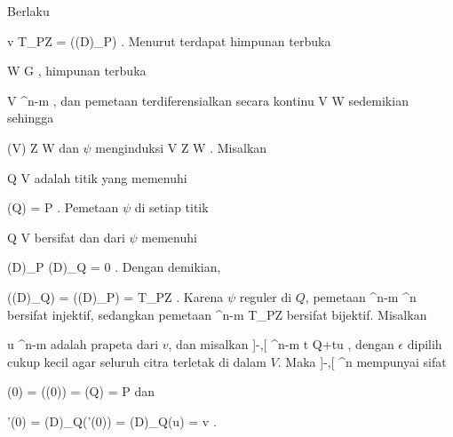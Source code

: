 

Berlaku

\mavergleichskettedisp
{\vergleichskette
{ v
}
{ \in }{ T_PZ
}
{ = }{ \ker \left((D\varphi)_P\right)
}
{ } {
}
{ } {
}
}
{}{}{.}
Menurut
terdapat himpunan terbuka

 {}
 {W \subseteq G} {}
 {} {} {} {,}
himpunan terbuka

\mavergleichskette
{\vergleichskette
{ V
}
{ \subseteq }{ \R^{n-m}
}
{ } {
}
{ } {
}
{ } {
}
}
{}{}{,}
dan pemetaan terdiferensialkan secara kontinu
\maabbdisp {\psi} { V } { W } {}
sedemikian sehingga

\mavergleichskette
{\vergleichskette
{ \psi(V)
}
{ \subseteq }{ Z \cap W
}
{ } {
}
{ } {
}
{ } {
}
}
{}{}{}
dan $\psi$ menginduksi
\maabbdisp {\psi} { V } { Z \cap W } {}.
Misalkan

\mavergleichskette
{\vergleichskette
{ Q
}
{ \in }{ V
}
{ } {
}
{ } {
}
{ } {
}
}
{}{}{}
adalah titik yang memenuhi

\mavergleichskettedisp
{\vergleichskette
{ \psi(Q)
}
{ =} { P
}
{ } {
}
{ } {
}
{ } {
}
}
{}{}{.}
Pemetaan $\psi$ di setiap titik

\mavergleichskette
{\vergleichskette
{ Q
}
{ \in }{ V
}
{ } {
}
{ } {
}
{ } {
}
}
{}{}{}
bersifat
dan
dari $\psi$ memenuhi

\mavergleichskettedisp
{\vergleichskette
{ (D\varphi)_P \circ (D\psi)_Q
}
{ =} { 0
}
{ } {
}
{ } {
}
{ } {
}
}
{}{}{.}
Dengan demikian,

\mavergleichskettedisp
{\vergleichskette
{  \left((D\psi)_Q\right)
}
{ =} { \ker \left((D\varphi)_P\right)
}
{ =} { T_PZ
}
{ } {
}
{ } {
}
}
{}{}{.}
Karena $\psi$ reguler di $Q$, pemetaan
 { \R^{n-m} } { \R^n } {}
bersifat injektif, sedangkan pemetaan
 { \R^{n-m} } { T_PZ } {}
bersifat bijektif. Misalkan

\mavergleichskette
{\vergleichskette
{ u
}
{ \in }{ \R^{n-m}
}
{ } {
}
{ } {
}
{ } {
}
}
{}{}{}
adalah prapeta dari $v$, dan misalkan
\maabbeledisp {\theta} { ]-\epsilon,\epsilon[ } { \R^{n-m} } {t} {Q+tu} {,}
dengan $\epsilon$ dipilih cukup kecil agar seluruh citra terletak di dalam $V$. Maka
\maabbdisp {\gamma=\psi\circ\theta} { ]-\epsilon,\epsilon[ } { \R^n } {}
mempunyai sifat

\mavergleichskettedisp
{\vergleichskette
{ \gamma(0)
}
{ =} { \psi(\theta(0))
}
{ =} { \psi(Q)
}
{ =} { P
}
{ } {
}
}
{}{}{}
dan

\mavergleichskettedisp
{\vergleichskette
{ \gamma'(0)
}
{ =} { (D\psi)_Q(\theta'(0))
}
{ =} { (D\psi)_Q(u)
}
{ =} { v
}
{ } {
}
}
{}{}{.}
